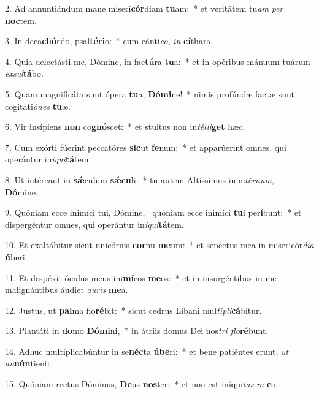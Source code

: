 2. Ad annuntiándum mane miseri\textbf{cór}diam \textbf{tu}am:~*  et veritátem tu\textit{am} \textit{per} \textbf{noc}tem.\

3. In deca\textbf{chór}do, psal\textbf{té}\textbf{ri}o:~*  cum cánti\textit{co}, \textit{in} \textbf{cí}thara.\

4. Quia delectásti me, Dómine, in fac\textbf{tú}ra \textbf{tu}a:~*  et in opéribus mánuum tuárum \textit{ex}\textit{sul}\textbf{tá}bo.\

5. Quam magnificáta sunt ópera \textbf{tu}a, \textbf{Dó}\textbf{mi}ne!~*  nimis profúndæ factæ sunt cogitati\textit{ó}\textit{nes} \textbf{tu}æ.\

6. Vir insípiens \textbf{non} co\textbf{gnó}scet:~*  et stultus non in\textit{tél}\textit{li}\textbf{get} hæc.\

7. Cum exórti fúerint peccatóres \textbf{sic}ut \textbf{fe}num:~*  et apparúerint omnes, qui operántur in\textit{i}\textit{qui}\textbf{tá}tem.\

8. Ut intéreant in \textbf{sǽ}culum \textbf{sǽ}\textbf{cu}li:~*  tu autem Altíssimus in æ\textit{tér}\textit{num}, \textbf{Dó}mine.\

9. Quóniam ecce inimíci tui, Dómine, \dag\  quóniam ecce inimíci \textbf{tu}i per\textbf{í}bunt:~*  et dispergéntur omnes, qui operántur in\textit{i}\textit{qui}\textbf{tá}tem.\

10. Et exaltábitur sicut unicórnis \textbf{cor}nu \textbf{me}um:~*  et senéctus mea in misericór\textit{di}\textit{a} \textbf{ú}beri.\

11. Et despéxit óculus meus ini\textbf{mí}cos \textbf{me}os:~*  et in insurgéntibus in me malignántibus áudiet \textit{au}\textit{ris} \textbf{me}a.\

12. Justus, ut \textbf{pal}ma flo\textbf{ré}bit:~*  sicut cedrus Líbani mul\textit{ti}\textit{pli}\textbf{cá}bitur.\

13. Plantáti in \textbf{do}mo \textbf{Dó}\textbf{mi}ni,~*  in átriis domus Dei nos\textit{tri} \textit{flo}\textbf{ré}bunt.\

14. Adhuc multiplicabúntur in se\textbf{néc}ta \textbf{ú}\textbf{be}ri:~*  et bene patiéntes erunt, \textit{ut} \textit{an}\textbf{nún}tient:\

15. Quóniam rectus Dóminus, \textbf{De}us \textbf{nos}ter:~*  et non est iníqui\textit{tas} \textit{in} \textbf{e}o.\

